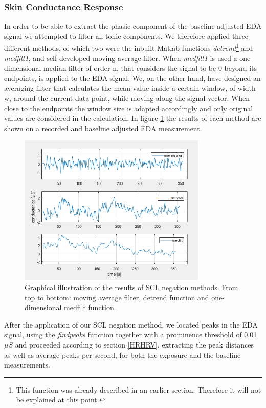 \subsubsection{Skin Conductance Response}
In order to be able to extract the phasic component of the baseline adjusted EDA signal we attempted to filter all tonic components. We therefore applied three different methods, of which two were the inbuilt Matlab functions \textit{detrend}\footnote{This function was already described in an earlier section. Therefore it will not be explained at this point.} and \textit{medfilt1}, and self developed moving average filter. When \textit{medfilt1} is used a one-dimensional median filter of order n, that considers the signal to be 0 beyond its endpoints, is applied to the EDA signal. We, on the other hand, have designed an averaging filter that calculates the mean value inside a certain window, of width w, around the current data point, while moving along the signal vector. When close to the endpoints the window size is adapted accordingly and only original values are considered in the calculation. In figure \ref{filtcompImg} the results of each method are shown on a recorded and baseline adjusted EDA measurement. 

\newpage
\begin{figure}[ht]
\centering
\includegraphics[width=0.8\textwidth]{images/filtcomp.png}
\caption{Graphical illustration of the results of SCL negation methods. From top to bottom: moving average filter, detrend function and one-dimensional medfilt function.}
\label{filtcompImg}
\end{figure}
   
After the application of our SCL negation method, we located peaks in the EDA signal, using the \textit{findpeaks} function together with a prominence threshold of 0.01 $\mu S$ and proceeded according to section \ref{HRHRV}, extracting the peak distances as well as average peaks per second, for both the exposure and the baseline measurements.

